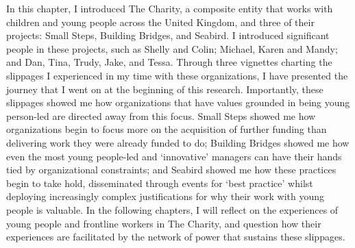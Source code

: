 In this chapter, I introduced The Charity, a composite entity that works with children and young people across the United Kingdom, and three of their projects: Small Steps, Building Bridges, and Seabird. I introduced significant people in these projects, such as Shelly and Colin; Michael, Karen and Mandy; and Dan, Tina, Trudy, Jake, and Tessa. Through three vignettes charting the slippages I experienced in my time with these organizations, I have presented the journey that I went on at the beginning of this research. Importantly, these slippages showed me how organizations that have values grounded in being young person-led are directed away from this focus. Small Steps showed me how organizations begin to focus more on the acquisition of further funding than delivering work they were already funded to do; Building Bridges showed me how even the most young people-led and `innovative' managers can have their hands tied by organizational constraints; and Seabird showed me how these practices begin to take hold, disseminated through events for `best practice' whilst deploying increasingly complex justifications for why their work with young people is valuable. In the following chapters, I will reflect on the experiences of young people and frontline workers in The Charity, and question how their experiences are facilitated by the network of power that sustains these slippages.